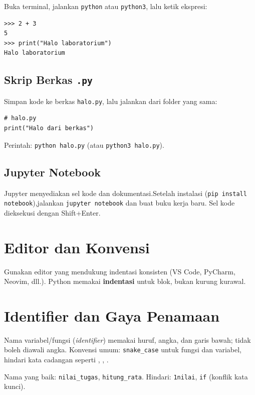 \documentclass[../main.tex]{subfiles}
\begin{document}
Buka terminal, jalankan \texttt{python} atau \texttt{python3}, lalu ketik ekspresi:

\begin{lstlisting}[caption=Contoh sesi REPL]
>>> 2 + 3
5
>>> print("Halo laboratorium")
Halo laboratorium
\end{lstlisting}

\subsection{Skrip Berkas \texttt{.py}}

Simpan kode ke berkas \texttt{halo.py}, lalu jalankan dari folder yang sama:

\begin{lstlisting}[caption=Skrip sederhana]
# halo.py
print("Halo dari berkas")
\end{lstlisting}

Perintah: \texttt{python halo.py} (atau \texttt{python3 halo.py}).

\subsection{Jupyter Notebook}

Jupyter menyediakan sel kode dan dokumentasi.\newline Setelah instalasi (\texttt{pip install notebook}),\newline jalankan \texttt{jupyter notebook} dan buat buku kerja baru. Sel kode dieksekusi dengan Shift+Enter.

\section{Editor dan Konvensi}

Gunakan editor yang mendukung indentasi konsisten (VS Code, PyCharm, Neovim, dll.). Python memakai \textbf{indentasi} untuk blok, bukan kurung kurawal.

\section{Identifier dan Gaya Penamaan}

Nama variabel/fungsi (\textit{identifier}) memakai huruf, angka, dan garis bawah; tidak boleh diawali angka. Konvensi umum: \texttt{snake\_case} untuk fungsi dan variabel, hindari kata cadangan seperti , , .

\begin{contoh}
Nama yang baik: \texttt{nilai\_tugas}, \texttt{hitung\_rata}. Hindari: \texttt{1nilai}, \texttt{if} (konflik kata kunci).
\end{contoh}
\end{document}
